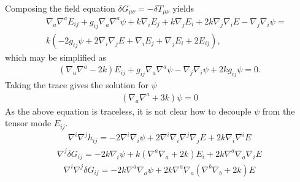 \documentclass[10pt,letterpaper]{article}
\numberwithin{equation}{section}
\begin{document}
Composing the field equation $\delta G_{\mu\nu} =-\delta T_{\mu\nu}$ yields
\begin{eqnarray}
&&\nabla_{a}\nabla^{a}E_{ij}
 +g_{ij} \nabla_{a}\nabla^{a}\psi
 + k \nabla_{i}E_{j}
 + k \nabla_{j}E_{i}
 + 2 k \nabla_{j}\nabla_{i}E
 -  \nabla_{j}\nabla_{i}\psi =
\nonumber \\
&& k (-2 g_{ij}\psi + 2\nabla_i\nabla_j E + \nabla_i E_j + \nabla_j E_i + 2E_{ij}),
\end{eqnarray}
which may be simplified as
\begin{eqnarray}
(\nabla_a \nabla^a-2k)E_{ij} + g_{ij}\nabla_a \nabla^a \psi - \nabla_j\nabla_i \psi+2k g_{ij}\psi = 0.
\end{eqnarray}
Taking the trace gives the solution for $\psi$
\begin{eqnarray}
(\nabla_a \nabla^a + 3k)\psi = 0
\end{eqnarray}
As the above equation is traceless, it is not clear how to decouple $\psi$ from the tensor mode $E_{ij}$. 
\begin{eqnarray}
\nabla^i \nabla^j h_{ij} = -2\nabla^i \nabla_i \psi + 2\nabla^i\nabla_i \nabla^j\nabla_j E + 2k \nabla_i \nabla^i E
\end{eqnarray}
\begin{eqnarray}
\nabla^j \delta G_{ij} =  -2k\nabla_i \psi + k(\nabla^a\nabla_a + 2k)E_i + 2k \nabla^a\nabla_a \nabla_i E 
\end{eqnarray}
\begin{eqnarray}
\nabla^i \nabla^j \delta G_{ij} = -2k\nabla^a \nabla_a \psi + 2k \nabla^a\nabla_a(\nabla^b \nabla_b + 2k)E
\end{eqnarray}
\end{document}

